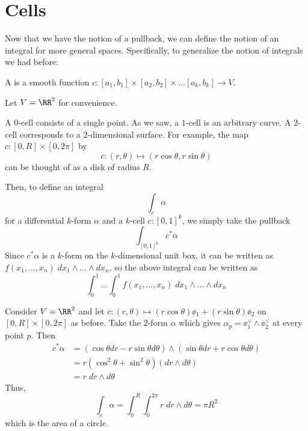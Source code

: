 \section{Cells}
Now that we have the notion of a pullback,
we can define the notion of an integral for more general spaces.
Specifically, to generalize the notion of integrals we had before:
\begin{definition}
	A  is a smooth function $c : [a_1, b_1] \times [a_2,b_2] \times \dots [a_k, b_k] \to V$.
\end{definition}
\begin{example}
	Let $V = \RR^2$ for convenience.
	\begin{enumerate}[(a)]
		\ii A $0$-cell consists of a single point.
		\ii As we saw, a $1$-cell is an arbitrary curve.
		\ii A $2$-cell corresponds to a $2$-dimensional surface.
		For example, the map $c : [0,R] \times [0,2\pi]$ by
		\[ c : (r,\theta) \mapsto (r\cos\theta, r\sin\theta) \]
		can be thought of as a disk of radius $R$.
	\end{enumerate}
\end{example}
Then, to define an integral
\[ \int_c \alpha \]
for a differential $k$-form $\alpha$ and a $k$-cell $c : [0,1]^k$, we simply take the pullback
\[ \int_{[0,1]^k} c^\ast \alpha \]
Since $c^\ast \alpha$ is a $k$-form on the $k$-dimensional unit box,
it can be written as $f(x_1, \dots, x_n) \; dx_1 \wedge \dots \wedge dx_n$,
so the above integral can be written as
\[ \int_0^1 \dots \int_0^1 f(x_1, \dots, x_n) \; dx_1 \wedge \dots \wedge dx_n \]

\begin{example}
	Consider $V = \RR^2$ and let $c : (r,\theta) \mapsto (r\cos\theta)\ee_1 + (r\sin\theta)\ee_2$
	on $[0,R] \times [0,2\pi]$ as before.
	Take the $2$-form $\alpha$ which gives $\alpha_p = \ee_1^\vee \wedge \ee_2^\vee$ at every point $p$.
	Then
	\begin{align*}
		c^\ast\alpha &= 
		\left( \cos\theta dr - r\sin\theta d\theta \right)
		\wedge
		\left( \sin\theta dr + r\cos\theta d\theta \right) \\
		&= r(\cos^2\theta+\sin^2\theta) (dr \wedge d\theta) \\
		&= r \; dr \wedge d\theta
	\end{align*}
	Thus,
	\[ \int_c \alpha
		= \int_0^R \int_0^{2\pi} r \; dr \wedge d\theta
		= \pi R^2 \]
	which is the area of a circle.
\end{example}

